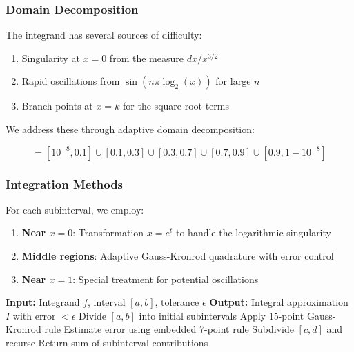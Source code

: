 \documentclass[12pt,letterpaper]{article}
\theoremstyle{plain}
\theoremstyle{definition}
\theoremstyle{remark}
\begin{document}
\subsubsection{Domain Decomposition}

The integrand has several sources of difficulty:
\begin{enumerate}
\item Singularity at $x = 0$ from the measure $dx/x^{3/2}$
\item Rapid oscillations from $\sin(n\pi\log_2(x))$ for large $n$
\item Branch points at $x = k$ for the square root terms
\end{enumerate}

We address these through adaptive domain decomposition:

\begin{equation}
[0,1] = [10^{-8}, 0.1] \cup [0.1, 0.3] \cup [0.3, 0.7] \cup [0.7, 0.9] \cup [0.9, 1-10^{-8}]
\end{equation}

\subsubsection{Integration Methods}

For each subinterval, we employ:

\begin{enumerate}
\item \textbf{Near $x = 0$}: Transformation $x = e^t$ to handle the logarithmic singularity
\item \textbf{Middle regions}: Adaptive Gauss-Kronrod quadrature with error control
\item \textbf{Near $x = 1$}: Special treatment for potential oscillations
\end{enumerate}

\begin{algorithm}
\caption{Adaptive Integration}
\begin{algorithmic}
\State \textbf{Input:} Integrand $f$, interval $[a,b]$, tolerance $\epsilon$
\State \textbf{Output:} Integral approximation $I$ with error $< \epsilon$
\State
\State Divide $[a,b]$ into initial subintervals
    \State Apply 15-point Gauss-Kronrod rule
    \State Estimate error using embedded 7-point rule
        \State Subdivide $[c,d]$ and recurse
    \EndIf
\EndFor
\State Return sum of subinterval contributions
\end{algorithmic}
\end{algorithm}
\end{document}
